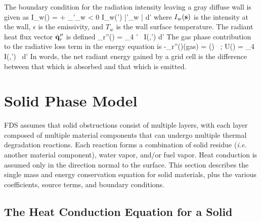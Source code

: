 \documentclass[11pt]{book}
\begin{document}
The boundary condition for the radiation intensity leaving
a gray diffuse wall is given as
\be I_w(\bs) =  + 
 \int_{\bs'\cdot \bn_w < 0} I_w(\bs')\; |\bs'\cdot \bn_w | \; d\bs'
 \label{RTEbc} \ee
where $I_w({\bf s})$ is the intensity at the wall, $\epsilon$ is the
emissivity, and $T_{w}$ is the wall surface temperature.
The radiant heat flux vector $\dot{\bf q}_r''$ is defined
\be \dbq_r''(\bx) = \int_{4\pi} \; \bs' \, I(\bx,\bs') \; d\bs'   \ee
The gas phase contribution to the radiative loss term in the energy
equation is
\be -\nabla \cdot \dbq_r''(\bx)(\mbox{gas}) =
    \kappa(\bx) \, \left[ U(\bx) - 4 \pi \, I_b(\bx) \right]  \quad ; \quad
    U(\bx) = \int_{4\pi} \, I(\bx,\bs') \, d\bs'
\ee
In words, the net radiant energy gained by a grid cell is the
difference between that which is absorbed and that which is emitted.






\clearpage
\section{Solid Phase Model}

FDS assumes that solid obstructions consist of multiple layers, with each
layer composed of multiple material components that can undergo multiple thermal degradation reactions.
Each reaction forms a combination of solid residue ({\em i.e.} another material component), water vapor, and/or fuel vapor. Heat
conduction is assumed only in the direction normal to the surface. This section describes the single
mass and energy conservation equation for solid materials, plus the various coefficients, source terms, and
boundary conditions.

\subsection{The Heat Conduction Equation for a Solid}
\end{document}
